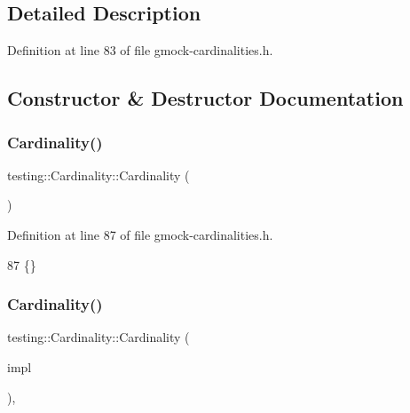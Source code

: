\subsection{Detailed Description}


Definition at line 83 of file gmock-\/cardinalities.\+h.



\subsection{Constructor \& Destructor Documentation}
\mbox{\label{classtesting_1_1Cardinality_ab4b4066d7f5e9e3c7f851e49ab892cd9}} 
\subsubsection{\texorpdfstring{Cardinality()}{Cardinality()}\hspace{0.1cm}{\footnotesize\ttfamily [1/2]}}
{\footnotesize\ttfamily testing\+::\+Cardinality\+::\+Cardinality (\begin{DoxyParamCaption}{ }\end{DoxyParamCaption})\hspace{0.3cm}{\ttfamily [inline]}}



Definition at line 87 of file gmock-\/cardinalities.\+h.


\begin{DoxyCode}
87 \{\}
\end{DoxyCode}
\mbox{\label{classtesting_1_1Cardinality_a10aed768b8a22d27110587444733771f}} 
\subsubsection{\texorpdfstring{Cardinality()}{Cardinality()}\hspace{0.1cm}{\footnotesize\ttfamily [2/2]}}
{\footnotesize\ttfamily testing\+::\+Cardinality\+::\+Cardinality (\begin{DoxyParamCaption}\item[{const \hyperlink{classtesting_1_1CardinalityInterface}{Cardinality\+Interface} $\ast$}]{impl }\end{DoxyParamCaption})\hspace{0.3cm}{\ttfamily [inline]}, {\ttfamily [explicit]}}



